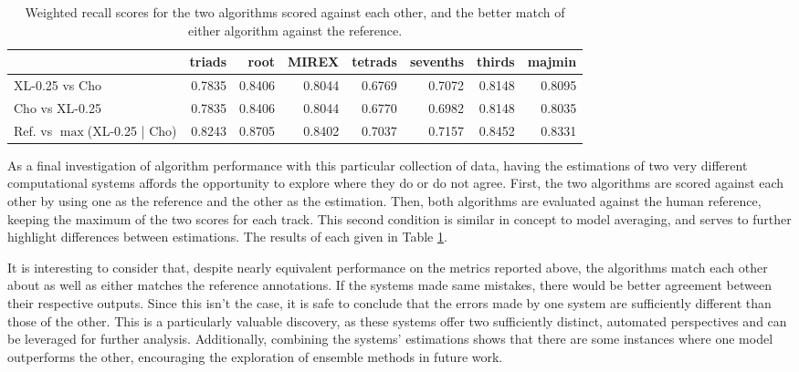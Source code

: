 \begin{table}[t]
\begin{center}
\scriptsize
\caption{Weighted recall scores for the two algorithms scored against each other, and the better match of either algorithm against the reference.}
\label{tab:algo_vs_algo}

\begin{tabular}{lrrrrrrr}
\hline
         &   triads &   root &   MIREX &   tetrads &   sevenths &   thirds &   majmin \\
\hline
 XL-0.25 vs Cho &   0.7835 & 0.8406 &  0.8044 &    0.6769 &     0.7072 &   0.8148 &   0.8095 \\
 Cho vs XL-0.25 &   0.7835 & 0.8406 &  0.8044 &    0.6770 &     0.6982 &   0.8148 &   0.8035 \\
 \hline
 Ref. vs $\max$(XL-0.25 | Cho) &   0.8243 & 0.8705  &  0.8402  &   0.7037   &   0.7157  &  0.8452  &  0.8331 \\
\hline
\end{tabular}
\end{center}
\end{table}

As a final investigation of algorithm performance with this particular collection of data, having the estimations of two very different computational systems affords the opportunity to explore where they do or do not agree.
First, the two algorithms are scored against each other by using one as the reference and the other as the estimation.
Then, both algorithms are evaluated against the human reference, keeping the maximum of the two scores for each track.
This second condition is similar in concept to model averaging, and serves to further highlight differences between estimations.
The results of each given in Table \ref{tab:algo_vs_algo}.

It is interesting to consider that, despite nearly equivalent performance on the metrics reported above, the algorithms match each other about as well as either matches the reference annotations.
If the systems made same mistakes, there would be better agreement between their respective outputs.
Since this isn't the case, it is safe to conclude that the errors made by one system are sufficiently different than those of the other.
This is a particularly valuable discovery, as these systems offer two sufficiently distinct, automated perspectives and can be leveraged for further analysis.
Additionally, combining the systems' estimations shows that there are some instances where one model outperforms the other, encouraging the exploration of ensemble methods in future work.

